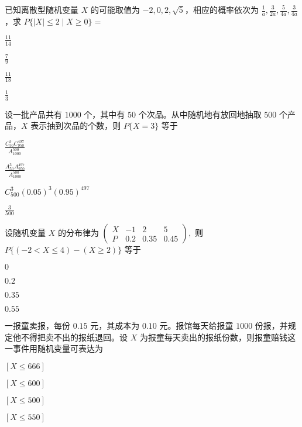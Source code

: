 \documentclass{exam-zh}
\begin{document}
\begin{question}
  已知离散型随机变量 $X$ 的可能取值为 $-2,0,2,\sqrt{5}$，相应的概率依次为 $\frac{1}{a}, \frac{3}{2a}, \frac{5}{4a}, \frac{3}{4a}$，求 $P\{|X|\leq 2\mid X\geq 0\} = $ \paren[A]
  \begin{choices}
    \item $\frac{11}{14}$  
    \item $\frac{7}{9}$  
    \item $\frac{11}{18}$  
    \item $\frac{1}{3}$  
  \end{choices}
\end{question}

\begin{question}
  设一批产品共有 $1000$ 个，其中有 $50$ 个次品。从中随机地有放回地抽取 $500$ 个产品，$X$ 表示抽到次品的个数，则 $P\{X = 3\}$ 等于 \paren[C]
  \begin{choices}
    \item $\frac{C^3_{50} C^{497}_{950}}{A^{500}_{1000}}$  
    \item $\frac{A^3_{50} A^{497}_{950}}{A^{500}_{1000}}$  
    \item $C^3_{500}(0.05)^3 (0.95)^{497}$  
    \item $\frac{3}{500}$  
  \end{choices}
\end{question}

\begin{question}
  设随机变量 $X$ 的分布律为  
  $
  \begin{pmatrix} 
  X & -1 & 2 & 5 \\ 
  P & 0.2 & 0.35 & 0.45 
  \end{pmatrix},$
  则  
  $P\{(-2 < X \leq 4) - (X \geq 2)\}$ 等于 \paren[B]
  \begin{choices}
    \item $0$  
    \item $0.2$  
    \item $0.35$  
    \item $0.55$  
  \end{choices}
\end{question}

\begin{question}
  一报童卖报，每份 $0.15$ 元，其成本为 $0.10$ 元。报馆每天给报童 $1000$ 份报，并规定他不得把卖不出的报纸退回。设 $X$ 为报童每天卖出的报纸份数，则报童赔钱这一事件用随机变量可表达为 \paren[A]
  \begin{choices}
    \item $[X \leq 666]$  
    \item $[X \leq 600]$  
    \item $[X \leq 500]$  
    \item $[X \leq 550]$  
  \end{choices}
\end{question}
\end{document}
